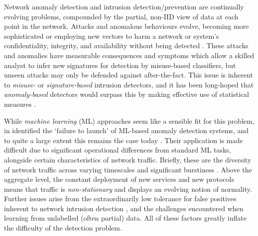 \documentclass[conference, a4paper, 10pt, times]{IEEEtran}
\begin{document}
Network anomaly detection and intrusion detection/prevention are continually evolving problems, compounded by the partial, non-IID view of data at each point in the network.
Attacks and anomalous behaviours evolve, becoming more sophisticated or employing new vectors to harm a network or system's confidentiality, integrity, and availability without being detected \cite{DBLP:journals/comsur/BhuyanBK14}.
These attacks and anomalies have measurable consequences and symptoms which allow a skilled analyst to infer new signatures for detection by misuse-based classifiers, but unseen attacks may only be defended against after-the-fact.
This issue is inherent to \emph{misuse-} or \emph{signature-based} intrusion detectors, and it has been long-hoped that \emph{anomaly-based} detectors would surpass this by making effective use of statistical measures \cite{DBLP:journals/comsur/BhuyanBK14}.

While \emph{machine learning} (ML) approaches seem like a sensible fit for this problem, in \citeyear{DBLP:conf/sp/SommerP10} \citeauthor{DBLP:conf/sp/SommerP10} identified the `failure to launch' of ML-based anomaly detection systems, and to quite a large extent this remains the case today \cite{DBLP:conf/sp/SommerP10}.
Their application is made difficult due to significant operational differences from standard ML tasks, alongside certain characteristics of network traffic.
Briefly, these are the diversity of network traffic across varying timescales \cite{DBLP:conf/sp/SommerP10} and significant burstiness \cite{DBLP:journals/ccr/LelandWTW95}.
Above the aggregate level, the constant deployment of new services and new protocols means that traffic is \emph{non-stationary} and displays an evolving notion of normality.
Further issues arise from the extraordinarily low tolerance for false positives inherent to network intrusion detection \cite{DBLP:conf/ccs/Axelsson99}, and the challenges encountered when learning from unlabelled (often partial) data.
All of these factors greatly inflate the difficulty of the detection problem.
\end{document}
